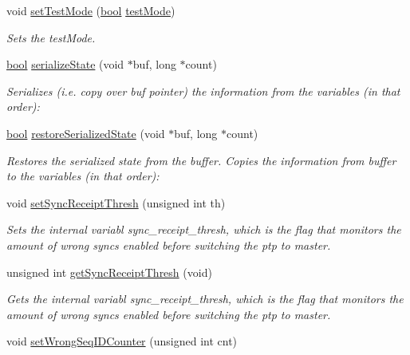 \begin{DoxyCompactItemize}
void \hyperlink{class_common_port_af12e3bb99414e67bf569609f0a631d6c}{set\+Test\+Mode} (\hyperlink{avb__gptp_8h_af6a258d8f3ee5206d682d799316314b1}{bool} \hyperlink{class_common_port_a4ca1649b0fc050ca483e5dd8996ac80d}{test\+Mode})
\begin{DoxyCompactList}\small\item\em Sets the test\+Mode. \end{DoxyCompactList}\item 
\hyperlink{avb__gptp_8h_af6a258d8f3ee5206d682d799316314b1}{bool} \hyperlink{class_common_port_a7ae77a9c4cc2f66b95fe47a58b571113}{serialize\+State} (void $\ast$buf, long $\ast$count)
\begin{DoxyCompactList}\small\item\em Serializes (i.\+e. copy over buf pointer) the information from the variables (in that order)\+: \end{DoxyCompactList}\item 
\hyperlink{avb__gptp_8h_af6a258d8f3ee5206d682d799316314b1}{bool} \hyperlink{class_common_port_a383669aeae1b1eeaa021267a0041d163}{restore\+Serialized\+State} (void $\ast$buf, long $\ast$count)
\begin{DoxyCompactList}\small\item\em Restores the serialized state from the buffer. Copies the information from buffer to the variables (in that order)\+: \end{DoxyCompactList}\item 
void \hyperlink{class_common_port_a31540371431c3d5aae1a79e7e0a6d9da}{set\+Sync\+Receipt\+Thresh} (unsigned int th)
\begin{DoxyCompactList}\small\item\em Sets the internal variabl sync\+\_\+receipt\+\_\+thresh, which is the flag that monitors the amount of wrong syncs enabled before switching the ptp to master. \end{DoxyCompactList}\item 
unsigned int \hyperlink{class_common_port_a1d21b1d5b5ee2cd801e1a14a0b311ce4}{get\+Sync\+Receipt\+Thresh} (void)
\begin{DoxyCompactList}\small\item\em Gets the internal variabl sync\+\_\+receipt\+\_\+thresh, which is the flag that monitors the amount of wrong syncs enabled before switching the ptp to master. \end{DoxyCompactList}\item 
void \hyperlink{class_common_port_aac7cd9d30fe06fec928c5c895ec65b53}{set\+Wrong\+Seq\+I\+D\+Counter} (unsigned int cnt)

\end{DoxyCompactItemize}
